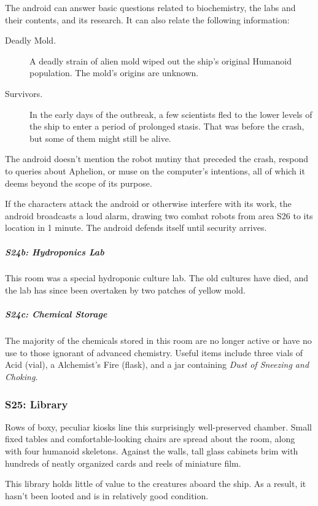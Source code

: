 \documentclass[10pt,a4paper,twoside,bg=print,twocolumn,openany,nodeprecatedcode]{dndbook}
\begin{document}
The android can answer basic questions related to biochemistry, the labs and their contents, and its research. It can also relate the following information:


\begin{description}
\item[Deadly Mold.]
A deadly strain of alien mold wiped out the ship's original Humanoid population. The mold's origins are unknown.
\item[Survivors.]
In the early days of the outbreak, a few scientists fled to the lower levels of the ship to enter a period of prolonged stasis. That was before the crash, but some of them might still be alive.
\end{description}

The android doesn't mention the robot mutiny that preceded the crash, respond to queries about Aphelion, or muse on the computer's intentions, all of which it deems beyond the scope of its purpose.

If the characters attack the android or otherwise interfere with its work, the android broadcasts a loud alarm, drawing two combat robots from area S26 to its location in 1 minute. The android defends itself until security arrives.

\subparagraph{S24b: Hydroponics Lab}
This room was a special hydroponic culture lab. The old cultures have died, and the lab has since been overtaken by two patches of yellow mold.

\subparagraph{S24c: Chemical Storage}
The majority of the chemicals stored in this room are no longer active or have no use to those ignorant of advanced chemistry. Useful items include three vials of Acid (vial), a Alchemist's Fire (flask), and a jar containing \textit{Dust of Sneezing and Choking}.

\subsubsection{S25: Library}
\begin{DndReadAloud}{}
Rows of boxy, peculiar kiosks line this surprisingly well-preserved chamber. Small fixed tables and comfortable-looking chairs are spread about the room, along with four humanoid skeletons. Against the walls, tall glass cabinets brim with hundreds of neatly organized cards and reels of miniature film.

\end{DndReadAloud}

This library holds little of value to the creatures aboard the ship. As a result, it hasn't been looted and is in relatively good condition.
\end{document}
